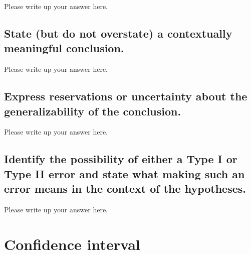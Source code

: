 \documentclass[
]{book}
\begin{document}
Please write up your answer here.

\hypertarget{state-but-do-not-overstate-a-contextually-meaningful-conclusion.-3}{%
\subsection*{State (but do not overstate) a contextually meaningful conclusion.}\label{state-but-do-not-overstate-a-contextually-meaningful-conclusion.-3}}

Please write up your answer here.

\hypertarget{express-reservations-or-uncertainty-about-the-generalizability-of-the-conclusion.-3}{%
\subsection*{Express reservations or uncertainty about the generalizability of the conclusion.}\label{express-reservations-or-uncertainty-about-the-generalizability-of-the-conclusion.-3}}

Please write up your answer here.

\hypertarget{identify-the-possibility-of-either-a-type-i-or-type-ii-error-and-state-what-making-such-an-error-means-in-the-context-of-the-hypotheses.-3}{%
\subsection*{Identify the possibility of either a Type I or Type II error and state what making such an error means in the context of the hypotheses.}\label{identify-the-possibility-of-either-a-type-i-or-type-ii-error-and-state-what-making-such-an-error-means-in-the-context-of-the-hypotheses.-3}}

Please write up your answer here.

\hypertarget{confidence-interval-1}{%
\section*{Confidence interval}\label{confidence-interval-1}}
\end{document}
